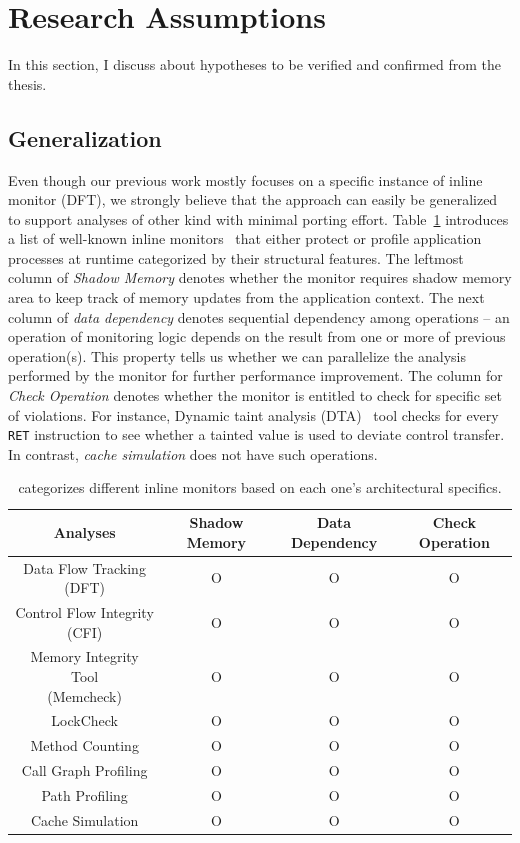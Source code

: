 \section{Research Assumptions} \label{sec:hypo} 

In this section, I discuss about hypotheses to be verified and confirmed
from the thesis.

\subsection{\sreplica Generalization}
\label{ssec:general}

Even though our previous work mostly focuses on a specific instance of inline
monitor (\ie DFT), we strongly believe that the approach can easily be
generalized to support analyses of other kind with minimal porting effort.
Table~\ref{tab:analyses} introduces a list of well-known inline
monitors~\cite{cab:oopsala2009} that either protect or profile application
processes at runtime categorized by their structural features. The leftmost
column of {\it Shadow Memory} denotes whether the monitor requires shadow
memory area to keep track of memory updates from the application context. The
next column of {\it data dependency} denotes sequential dependency among
operations -- an operation of monitoring logic depends on the result from one
or more of previous operation(s). This property tells us whether we can
parallelize the analysis performed by the monitor for further performance
improvement. The column for {\it Check Operation} denotes whether the monitor
is entitled to check for specific set of violations. For instance, Dynamic
taint analysis (DTA)~\cite{taintcheck:ndss2005} tool checks for every {\tt RET}
instruction to see whether a tainted value is used to deviate control transfer.
In contrast, {\it cache simulation} does not have such operations.

\begin{table}[h]
    \centering
\begin{tabular}{|c|c|c|c|}
\hline
Analyses & Shadow Memory & Data Dependency & Check Operation \\ 
\hline \hline
Data Flow Tracking (DFT) & O & O & O \\ \hline
Control Flow Integrity (CFI) & O & O & O \\ \hline
\specialcell{Memory Integrity Tool \\ (Memcheck)} & O & O & O \\ \hline
LockCheck & O & O & O \\ \hline
Method Counting & O & O & O \\ \hline
Call Graph Profiling & O & O & O \\ \hline
Path Profiling & O & O & O \\ \hline
Cache Simulation & O & O & O \\ \hline
\end{tabular}
\caption{ categorizes different inline monitors based on each one's
architectural specifics. \label{tab:analyses}}
\end{table}

